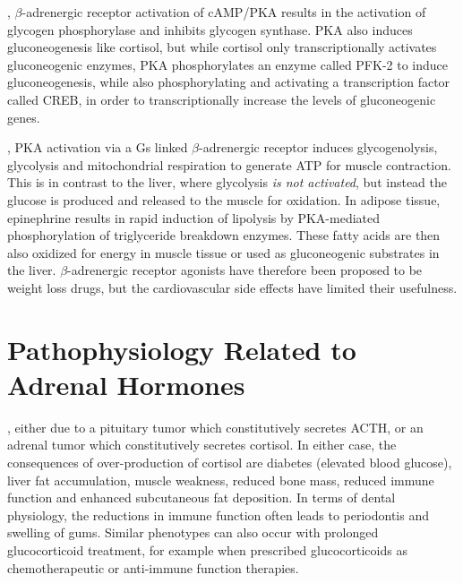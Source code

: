 \documentclass{tufte-handout}
\begin{document}
, $\beta$-adrenergic receptor activation of cAMP/PKA results in the activation of glycogen phosphorylase and inhibits glycogen synthase.  PKA also induces gluconeogenesis like cortisol, but while cortisol only  transcriptionally activates gluconeogenic enzymes, PKA phosphorylates an enzyme called PFK-2 to induce gluconeogenesis, while also phosphorylating and activating a transcription factor called CREB, in order to transcriptionally increase the levels of gluconeogenic genes.

, PKA activation via a Gs linked $\beta$-adrenergic receptor induces glycogenolysis, glycolysis and mitochondrial respiration to generate ATP for muscle contraction.  This is in contrast to the liver, where glycolysis \emph{is not activated}, but instead the glucose is produced and released  to the muscle for oxidation.  In adipose tissue, epinephrine results in rapid induction of lipolysis by PKA-mediated phosphorylation of triglyceride breakdown enzymes.  These fatty acids are then also oxidized for energy in muscle tissue or used as gluconeogenic substrates in the liver.  $\beta$-adrenergic receptor agonists have therefore been proposed to be weight loss drugs, but the cardiovascular side effects have limited their usefulness.

\section{Pathophysiology Related to Adrenal Hormones}

, either due to a pituitary tumor which constitutively secretes ACTH, or an adrenal tumor which constitutively secretes cortisol.  In either case, the consequences of over-production of cortisol are diabetes (elevated blood glucose), liver fat accumulation, muscle weakness, reduced bone mass, reduced immune function and enhanced subcutaneous fat deposition.  In terms of dental physiology, the reductions in immune function often leads to periodontis and swelling of gums. Similar phenotypes can also occur with prolonged glucocorticoid treatment, for example when prescribed glucocorticoids as chemotherapeutic or anti-immune function therapies.
\end{document}
